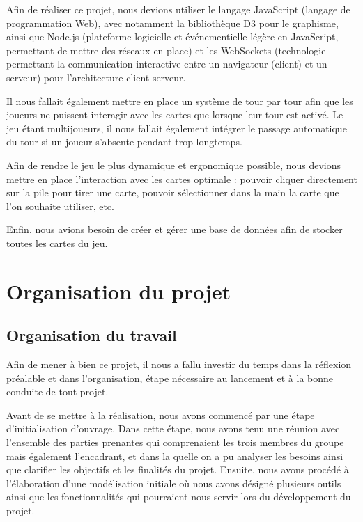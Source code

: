 \documentclass[12pt]{report}
\begin{document}
    Afin de réaliser ce projet, nous devions utiliser le langage JavaScript (langage de programmation Web), avec notamment la bibliothèque D3 pour le graphisme, ainsi que Node.js (plateforme logicielle et événementielle légère en JavaScript, permettant de mettre des réseaux en place) et les WebSockets (technologie permettant la communication interactive entre un navigateur (client) et un serveur) pour l'architecture client-serveur.


    Il nous fallait également mettre en place un système de tour par tour afin que les joueurs ne puissent interagir avec les cartes que lorsque leur tour est activé. Le jeu étant multijoueurs, il nous fallait également intégrer le passage automatique du tour si un joueur s'absente pendant trop longtemps.


    Afin de rendre le jeu le plus dynamique et ergonomique possible, nous devions mettre en place l'interaction avec les cartes optimale : pouvoir cliquer directement sur la pile pour tirer une carte, pouvoir sélectionner dans la main la carte que l'on souhaite utiliser, etc.

    Enfin, nous avions besoin de créer et gérer une base de données afin de stocker toutes les cartes du jeu.

\chapter{Organisation du projet}

    \section{Organisation du travail}
		Afin de mener à bien  ce projet, il nous a fallu investir du temps dans la réflexion préalable et dans l’organisation, étape nécessaire au lancement et  à la bonne conduite  de tout projet.

		Avant de se mettre à  la réalisation, nous avons commencé par une étape d’initialisation d’ouvrage. Dans cette étape, nous avons tenu une réunion avec l’ensemble des parties prenantes  qui comprenaient les trois membres du groupe  mais également l’encadrant, et dans la quelle on a pu analyser  les besoins ainsi que clarifier les objectifs et les finalités du projet.
		Ensuite, nous avons procédé à l’élaboration d'une modélisation initiale où nous avons désigné plusieurs outils ainsi que les fonctionnalités qui pourraient nous servir lors du  développement du projet.
\end{document}
